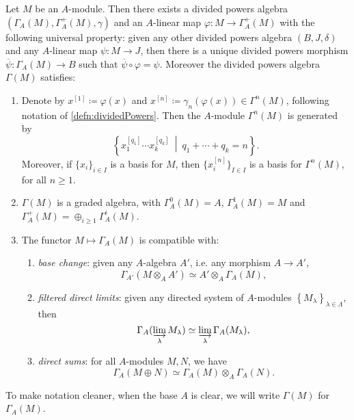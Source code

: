 \documentclass[../Main]{subfiles}
\begin{document}
\begin{thm}\label{thm:PDSymAlg}
	Let $M$ be an $A$-module.
	Then there exists a divided powers algebra 
	$\left(\Gamma_A(M), \Gamma_A^+(M), \gamma\right)$ and an $A$-linear
	map $\varphi\colon M \to \Gamma_A^+(M)$ with the following
	universal property:
	given any other divided powers algebra
	$\left(B, J, \delta\right)$ and any $A$-linear
	map $\psi\colon M \to J$,
	then there is a unique divided powers morphism
	$\overline{\psi}\colon \Gamma_A(M) \to B$
	such that $\overline{\psi} \circ \varphi = \psi$.
	Moreover the divided powers algebra $\Gamma(M)$ satisfies:
\begin{enumerate}
	\item Denote by $x^{[1]} \coloneqq \varphi(x)$ and $x^{[n]} \coloneqq \gamma_n(\varphi(x)) \in
		\Gamma^n(M)$, following notation of \cref{defn:dividedPowers}.
		Then the $A$-module $\Gamma^n(M)$ is generated by
		\begin{equation*}
		\left\{ x_1^{[q_1]} \cdots x_k^{[q_k]} \ \middle|\ 
		q_1 + \cdots + q_k = n \right\}
		.\end{equation*}
		Moreover, if $\{ x_i \}_{i \in I}$ is a basis
		for $M$, then $\{ x^{[n]}_i \}_{I \in I}$
		is a basis for $\Gamma^n(M)$,
		for all $n \geq 1$.

	\item $\Gamma(M)$ is a graded algebra, with
		$\Gamma_A^0(M) = A$, $\Gamma_A^1(M) = M$
		and $\Gamma_A^+(M) = \oplus_{i \geq 1} \Gamma_A^i(M)$.

	\item The functor $M \mapsto \Gamma_A(M)$ is compatible with:
		\begin{enumerate}
			\item {\em base change}: given any $A$-algebra $A'$,
				i.e. any morphism $A \to A'$,
				\begin{equation*}
					\Gamma_{A'}(M \otimes_A A') \simeq A' \otimes_A \Gamma_A(M)
				,\end{equation*}

			\item {\em filtered direct limits}: given any directed system
				of $A$-modules $\left\{ M_\lambda \right\}_{\lambda \in \Lambda}$, then
				\begin{equation*}
					\Gamma_A(\varinjlim_\lambda M_\lambda) \simeq
					\varinjlim_\lambda \Gamma_A(M_\lambda)
				,\end{equation*}
				
			\item {\em direct sums}: for all $A$-modules $M,N$, we have
				\begin{equation*}
					\Gamma_A(M \oplus N) \simeq
					\Gamma_A(M) \otimes_A \Gamma_A(N)
				.\end{equation*}
		\end{enumerate}
\end{enumerate}
	To make notation cleaner, when the base $A$ is clear, we
	will write $\Gamma(M)$ for $\Gamma_A(M)$.
\end{thm}
\end{document}
